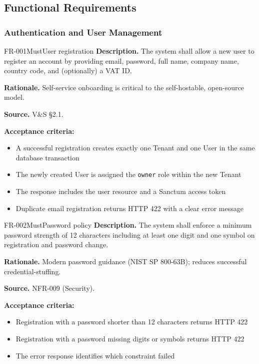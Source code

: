 \documentclass[11pt,a4paper]{article}
\begin{document}
\subsection{Functional Requirements}

\subsubsection{Authentication and User Management}

\begin{requirement}{FR-001}{Must}{User registration}
\textbf{Description.} The system shall allow a new user to register an account by providing email, password, full name, company name, country code, and (optionally) a VAT ID.

\textbf{Rationale.} Self-service onboarding is critical to the self-hostable, open-source model.

\textbf{Source.} V\&S \S2.1.

\textbf{Acceptance criteria:}
\begin{itemize}
    \item A successful registration creates exactly one Tenant and one User in the same database transaction
    \item The newly created User is assigned the \texttt{owner} role within the new Tenant
    \item The response includes the user resource and a Sanctum access token
    \item Duplicate email registration returns HTTP 422 with a clear error message
\end{itemize}
\end{requirement}

\begin{requirement}{FR-002}{Must}{Password policy}
\textbf{Description.} The system shall enforce a minimum password strength of 12 characters including at least one digit and one symbol on registration and password change.

\textbf{Rationale.} Modern password guidance (NIST SP 800-63B); reduces successful credential-stuffing.

\textbf{Source.} NFR-009 (Security).

\textbf{Acceptance criteria:}
\begin{itemize}
    \item Registration with a password shorter than 12 characters returns HTTP 422
    \item Registration with a password missing digits or symbols returns HTTP 422
    \item The error response identifies which constraint failed
\end{itemize}
\end{requirement}
\end{document}
